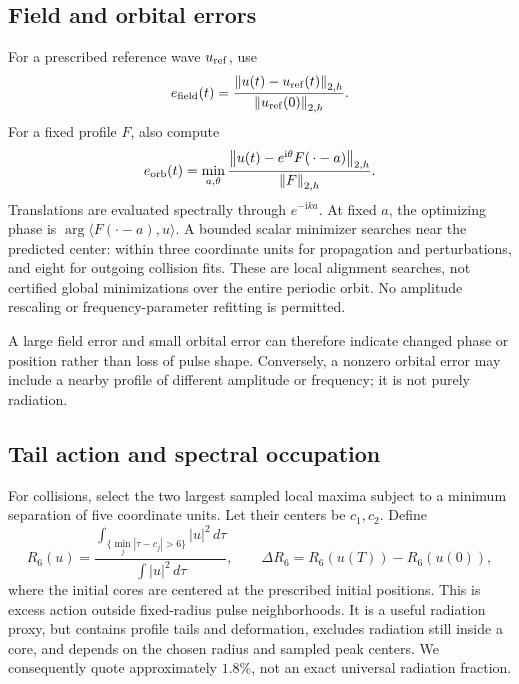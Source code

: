 \documentclass[10pt,letterpaper]{article}
\numberwithin{equation}{section}
\newcommand{\ii}{\mathrm{i}}
\newcommand{\norm}[1]{\left\|#1\right\|}
\begin{document}
\subsection{Field and orbital errors}
For a prescribed reference wave $u_{\rm ref}$, use
\begin{equation}
 e_{\rm field}(t)=\frac{\norm{u(t)-u_{\rm ref}(t)}_{2,h}}
                         {\norm{u_{\rm ref}(0)}_{2,h}}.
\end{equation}
For a fixed profile $F$, also compute
\begin{equation}\label{eq:orb}
 e_{\rm orb}(t)=\min_{a,\theta}
     \frac{\norm{u(t)-e^{\ii\theta}F(\,\cdot-a)}_{2,h}}{\norm F_{2,h}}.
\end{equation}
Translations are evaluated spectrally through $e^{-\ii ka}$. At fixed $a$, the optimizing phase is $\arg\langle F(\cdot-a),u\rangle$. A bounded scalar minimizer searches near the predicted center: within three coordinate units for propagation and perturbations, and eight for outgoing collision fits. These are local alignment searches, not certified global minimizations over the entire periodic orbit. No amplitude rescaling or frequency-parameter refitting is permitted.

A large field error and small orbital error can therefore indicate changed phase or position rather than loss of pulse shape. Conversely, a nonzero orbital error may include a nearby profile of different amplitude or frequency; it is not purely radiation.

\subsection{Tail action and spectral occupation}
For collisions, select the two largest sampled local maxima subject to a minimum separation of five coordinate units. Let their centers be $c_1,c_2$. Define
\begin{equation}
 R_6(u)=\frac{\int_{\{\min_j|\tau-c_j|>6\}}|u|^2\,d\tau}
                  {\int|u|^2\,d\tau},\qquad
 \Delta R_6=R_6(u(T))-R_6(u(0)),\label{eq:tail}
\end{equation}
where the initial cores are centered at the prescribed initial positions. This is excess action outside fixed-radius pulse neighborhoods. It is a useful radiation proxy, but contains profile tails and deformation, excludes radiation still inside a core, and depends on the chosen radius and sampled peak centers. We consequently quote approximately $1.8\%$, not an exact universal radiation fraction.
\end{document}
